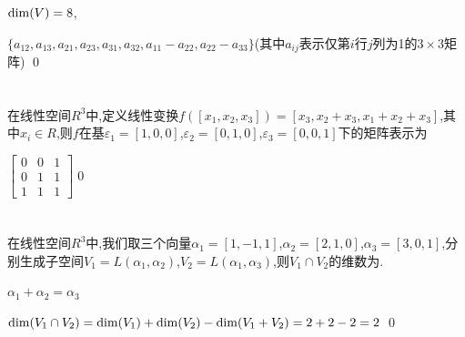 \documentclass{matrix-homework}
\begin{document}
\answer
$\mathrm{dim}(V)=8$,

$\{a_{12},a_{13},a_{21},a_{23},a_{31},a_{32},a_{11}-a_{22},a_{22}-a_{33}\}$(其中$a_{ij}$表示仅第$i$行$j$列为1的$3\times3$矩阵)
\qed

\section{}
在线性空间$R^3$中,定义线性变换$f([x_1,x_2,x_3])=[x_3,x_2+x_3,x_1+x_2+x_3]$,其中$x_i\in R$,则$f$在基$\varepsilon_1=[1,0,0]$,$\varepsilon_2=[0,1,0]$,$\varepsilon_3=[0,0,1]$下的矩阵表示为

\answer
$
    \begin{bmatrix}
        0 & 0 & 1 \\
        0 & 1 & 1 \\
        1 & 1 & 1
    \end{bmatrix}
$\qed

\section{}
在线性空间$R^3$中,我们取三个向量$\alpha_1=[1,-1,1]$,$\alpha_2=[2,1,0]$,$\alpha_3=[3,0,1]$,分别生成子空间$V_1=L(\alpha_1,\alpha_2)$,$V_2=L(\alpha_1,\alpha_3)$,则$V_1\cap  V_2$的维数为.

\answer
$\alpha_1+\alpha_2=\alpha_3$

$\mathrm{dim}(V_1\cap V_2) = \mathrm{dim}(V_1) + \mathrm{dim}(V_2) - \mathrm{dim}(V_1 + V_2) = 2+2-2 = 2$
\qed
\end{document}
